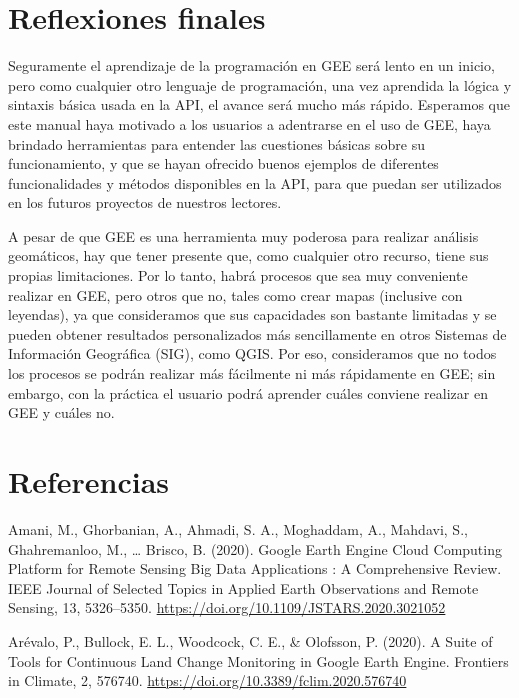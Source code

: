 \documentclass[
  12pt,
  letterpaper,
  twoside]{book}
\begin{document}
\newpage

\hypertarget{reflexiones-finales}{%
\chapter{Reflexiones finales}\label{reflexiones-finales}}

Seguramente el aprendizaje de la programación en GEE será lento en un inicio, pero como cualquier otro lenguaje de programación, una vez aprendida la lógica y sintaxis básica usada en la API, el avance será mucho más rápido. Esperamos que este manual haya motivado a los usuarios a adentrarse en el uso de GEE, haya brindado herramientas para entender las cuestiones básicas sobre su funcionamiento, y que se hayan ofrecido buenos ejemplos de diferentes funcionalidades y métodos disponibles en la API, para que puedan ser utilizados en los futuros proyectos de nuestros lectores.

A pesar de que GEE es una herramienta muy poderosa para realizar análisis geomáticos, hay que tener presente que, como cualquier otro recurso, tiene sus propias limitaciones. Por lo tanto, habrá procesos que sea muy conveniente realizar en GEE, pero otros que no, tales como crear mapas (inclusive con leyendas), ya que consideramos que sus capacidades son bastante limitadas y se pueden obtener resultados personalizados más sencillamente en otros Sistemas de Información Geográfica (SIG), como QGIS. Por eso, consideramos que no todos los procesos se podrán realizar más fácilmente ni más rápidamente en GEE; sin embargo, con la práctica el usuario podrá aprender cuáles conviene realizar en GEE y cuáles no.

\newpage

\hypertarget{referencias}{%
\chapter{Referencias}\label{referencias}}

Amani, M., Ghorbanian, A., Ahmadi, S. A., Moghaddam, A., Mahdavi, S., Ghahremanloo, M., \ldots{} Brisco, B. (2020). Google Earth Engine Cloud Computing Platform for Remote Sensing Big Data Applications : A Comprehensive Review. IEEE Journal of Selected Topics in Applied Earth Observations and Remote Sensing, 13, 5326--5350. \url{https://doi.org/10.1109/JSTARS.2020.3021052}

Arévalo, P., Bullock, E. L., Woodcock, C. E., \& Olofsson, P. (2020). A Suite of Tools for Continuous Land Change Monitoring in Google Earth Engine. Frontiers in Climate, 2, 576740. \url{https://doi.org/10.3389/fclim.2020.576740}
\end{document}
